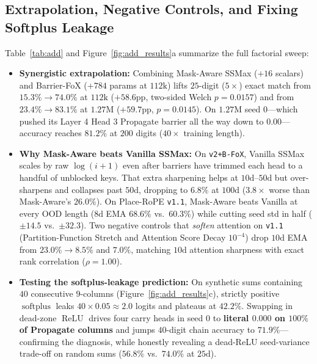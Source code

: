 \documentclass[10pt]{article}
\begin{document}
\subsection{Extrapolation, Negative Controls, and Fixing Softplus Leakage}

Table~\ref{tab:add} and Figure~\ref{fig:add_results}a summarize the full factorial sweep:
\begin{itemize}
  \item \textbf{Synergistic extrapolation:} Combining Mask-Aware SSMax ($+16$ scalars) and Barrier-FoX ($+784$ params at $112\text{k}$) lifts $25$-digit ($5\times$) exact match from $15.3\% \to \mathbf{74.0\%}$ at $112\text{k}$ ($+58.6\text{pp}$, two-sided Welch $p=0.0157$) and from $23.4\% \to \mathbf{83.1\%}$ at $1.27\text{M}$ ($+59.7\text{pp}$, $p=0.0145$). On $1.27\text{M}$ seed 0---which pushed its Layer 4 Head 3 Propagate barrier all the way down to $0.00$---accuracy reaches $\mathbf{81.2\%}$ at $200$ digits ($40\times$ training length).
  \item \textbf{Why Mask-Aware beats Vanilla SSMax:} On \texttt{v2+B-FoX}, Vanilla SSMax scales by raw $\log(i+1)$ even after barriers have trimmed each head to a handful of unblocked keys. That extra sharpening helps at $10\text{d--}50\text{d}$ but over-sharpens and collapses past $50\text{d}$, dropping to $6.8\%$ at $100\text{d}$ ($3.8\times$ worse than Mask-Aware's $26.0\%$). On Place-RoPE \texttt{v1.1}, Mask-Aware beats Vanilla at every OOD length ($8\text{d}$ EMA $68.6\%$ vs.\ $60.3\%$) while cutting seed std in half ($\pm 14.5$ vs.\ $\pm 32.3$). Two negative controls that \emph{soften} attention on \texttt{v1.1} (Partition-Function Stretch and Attention Score Decay $10^{-4}$) drop $10\text{d}$ EMA from $23.0\% \to 8.5\%$ and $7.0\%$, matching $10\text{d}$ attention sharpness with exact rank correlation ($\rho = 1.00$).
  \item \textbf{Testing the softplus-leakage prediction:} On synthetic sums containing $40$ consecutive $9$-columns (Figure~\ref{fig:add_results}c), strictly positive $\operatorname{softplus}$ leaks $40 \times 0.05 \approx 2.0$ logits and plateaus at $42.2\%$. Swapping in dead-zone $\operatorname{ReLU}$ drives four carry heads in seed 0 to \textbf{literal $0.000$ on $100\%$ of Propagate columns} and jumps $40$-digit chain accuracy to $\mathbf{71.9\%}$---confirming the diagnosis, while honestly revealing a dead-ReLU seed-variance trade-off on random sums ($56.8\%$ vs.\ $74.0\%$ at $25\text{d}$).
\end{itemize}
\end{document}
